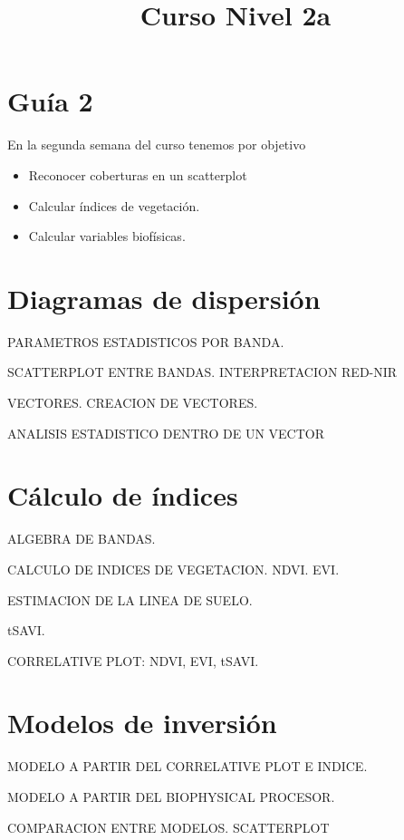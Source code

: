 \documentclass[a4paper]{article}
\title{Curso Nivel 2a}
\begin{document}
\section{Guía 2}
En la segunda semana del curso tenemos por objetivo
\begin{itemize}
    \item Reconocer coberturas en un scatterplot
    \item Calcular índices de vegetación.
    \item Calcular variables biofísicas.
\end{itemize}

\section{Diagramas de dispersión}

PARAMETROS ESTADISTICOS POR BANDA.

SCATTERPLOT ENTRE BANDAS. INTERPRETACION RED-NIR

VECTORES. CREACION DE VECTORES.

ANALISIS ESTADISTICO DENTRO DE UN VECTOR

\section{Cálculo de índices}

ALGEBRA DE BANDAS.

CALCULO DE INDICES DE VEGETACION. NDVI. EVI.

ESTIMACION DE LA LINEA DE SUELO.

tSAVI.

CORRELATIVE PLOT: NDVI, EVI, tSAVI.

\section{Modelos de inversión}

MODELO A PARTIR DEL CORRELATIVE PLOT E INDICE.

MODELO A PARTIR DEL BIOPHYSICAL PROCESOR.

COMPARACION ENTRE MODELOS. SCATTERPLOT
\end{document}

